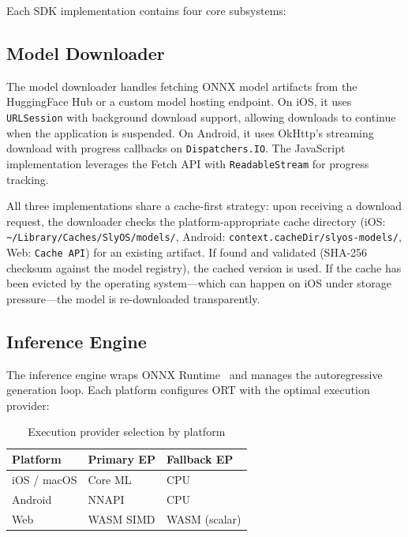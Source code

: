 \documentclass[12pt, letterpaper, twoside]{report}
\begin{document}
Each SDK implementation contains four core subsystems:

\subsection{Model Downloader}
\label{subsec:model_downloader}

The model downloader handles fetching ONNX model artifacts from the HuggingFace Hub or a custom model hosting endpoint. On iOS, it uses \texttt{URLSession} with background download support, allowing downloads to continue when the application is suspended. On Android, it uses OkHttp's streaming download with progress callbacks on \texttt{Dispatchers.IO}. The JavaScript implementation leverages the Fetch API with \texttt{ReadableStream} for progress tracking.

All three implementations share a cache-first strategy: upon receiving a download request, the downloader checks the platform-appropriate cache directory (iOS: \texttt{\textasciitilde/Library/Caches/SlyOS/models/}, Android: \texttt{context.cacheDir/slyos-models/}, Web: \texttt{Cache API}) for an existing artifact. If found and validated (SHA-256 checksum against the model registry), the cached version is used. If the cache has been evicted by the operating system---which can happen on iOS under storage pressure---the model is re-downloaded transparently.

\subsection{Inference Engine}
\label{subsec:inference_engine}

The inference engine wraps ONNX Runtime~\cite{onnxruntime2019} and manages the autoregressive generation loop. Each platform configures ORT with the optimal execution provider:

\begin{table}[H]
\centering
\caption{Execution provider selection by platform}
\label{tab:ep_selection}
\begin{tabular}{@{}lll@{}}
\toprule
\textbf{Platform} & \textbf{Primary EP} & \textbf{Fallback EP} \\
\midrule
iOS / macOS & Core ML & CPU \\
Android     & NNAPI   & CPU \\
Web         & WASM SIMD & WASM (scalar) \\
\bottomrule
\end{tabular}
\end{table}
\end{document}

